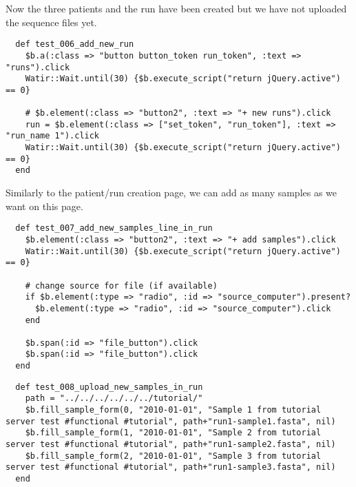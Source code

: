 
Now the three patients and the run have been created but we have not uploaded
the sequence files yet.

\begin{verbatim}
  def test_006_add_new_run
    $b.a(:class => "button button_token run_token", :text => "runs").click
    Watir::Wait.until(30) {$b.execute_script("return jQuery.active") == 0}

    # $b.element(:class => "button2", :text => "+ new runs").click
    run = $b.element(:class => ["set_token", "run_token"], :text => "run_name 1").click
    Watir::Wait.until(30) {$b.execute_script("return jQuery.active") == 0}
  end

\end{verbatim}

Similarly to the patient/run creation page, we can add as many samples as we
want on this page.

\begin{verbatim}
  def test_007_add_new_samples_line_in_run
    $b.element(:class => "button2", :text => "+ add samples").click
    Watir::Wait.until(30) {$b.execute_script("return jQuery.active") == 0}

    # change source for file (if available)
    if $b.element(:type => "radio", :id => "source_computer").present?
      $b.element(:type => "radio", :id => "source_computer").click
    end
  
    $b.span(:id => "file_button").click
    $b.span(:id => "file_button").click
  end

\end{verbatim}

\begin{verbatim}
  def test_008_upload_new_samples_in_run
    path = "../../../../../../tutorial/"
    $b.fill_sample_form(0, "2010-01-01", "Sample 1 from tutorial server test #functional #tutorial", path+"run1-sample1.fasta", nil)
    $b.fill_sample_form(1, "2010-01-01", "Sample 2 from tutorial server test #functional #tutorial", path+"run1-sample2.fasta", nil)
    $b.fill_sample_form(2, "2010-01-01", "Sample 3 from tutorial server test #functional #tutorial", path+"run1-sample3.fasta", nil)
  end

\end{verbatim}

